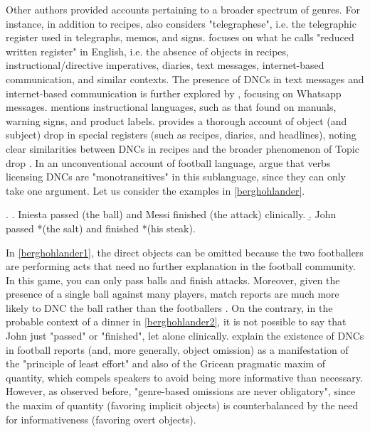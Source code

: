 Other authors provided accounts pertaining to a broader spectrum of genres. For instance, in addition to recipes, \textcite{Cote1996} also considers "telegraphese", i.e. the telegraphic register used in telegraphs, memos, and signs. \textcite{Weir2017} focuses on what he calls "reduced written register" in English, i.e. the absence of objects in recipes, instructional/directive imperatives, diaries, text messages, internet-based communication, and similar contexts. The presence of DNCs in text messages and internet-based communication is further explored by \textcite{StarkMeier2017}, focusing on Whatsapp messages. \textcite[304]{Liu2008} mentions instructional languages, such as that found on manuals, warning signs, and product labels. \textcite{Paesani2006} provides a thorough account of object (and subject) drop in special registers (such as recipes, diaries, and headlines), noting clear similarities between DNCs in recipes and the broader phenomenon of Topic drop \parencite[165]{Paesani2006}. In an unconventional account of football language, \textcite{BerghOhlander2016} argue that verbs licensing DNCs are "monotransitives" \parencite[54]{quirk1985grammar} in this sublanguage, since they can only take one argument. Let us consider the examples in \ref{berghohlander}.

\ex. \label{berghohlander} \a. \label{berghohlander1} Iniesta passed (the ball) and Messi finished (the attack) clinically.
\b. \label{berghohlander2} John passed *(the salt) and finished *(his steak).

In \ref{berghohlander1}, the direct objects can be omitted because the two footballers are performing acts that need no further explanation in the football community. In this game, you can only pass balls and finish attacks. Moreover, given the presence of a single ball against many players, match reports are much more likely to DNC the ball rather than the footballers \parencite[167]{RuppenhoferMichaelis2010}. On the contrary, in the probable context of a dinner in \ref{berghohlander2}, it is not possible to say that John just "passed" or "finished", let alone clinically. \textcite[22]{BerghOhlander2016} explain the existence of DNCs in football reports (and, more generally, object omission) as a manifestation of the "principle of least effort" \parencite{zipf1949leasteffort} and also of the Gricean pragmatic maxim of quantity, which compels speakers to avoid being more informative than necessary. However, as \textcite[166]{RuppenhoferMichaelis2010} observed before, "genre-based omissions are never obligatory", since the maxim of quantity (favoring implicit objects) is counterbalanced by the need for informativeness (favoring overt objects).


